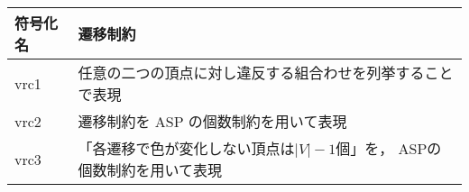 \begin{tabular}{l|p{8cm}}
  符号化名 & 遷移制約 \\\hline
  vrc1 & 任意の二つの頂点に対し違反する組合わせを列挙することで表現  \\ \hline
  vrc2 & 遷移制約を ASP の個数制約を用いて表現\\\hline
  vrc3 & 「各遷移で色が変化しない頂点は$|V|-1$個」を，
         ASPの個数制約を用いて表現
\end{tabular}